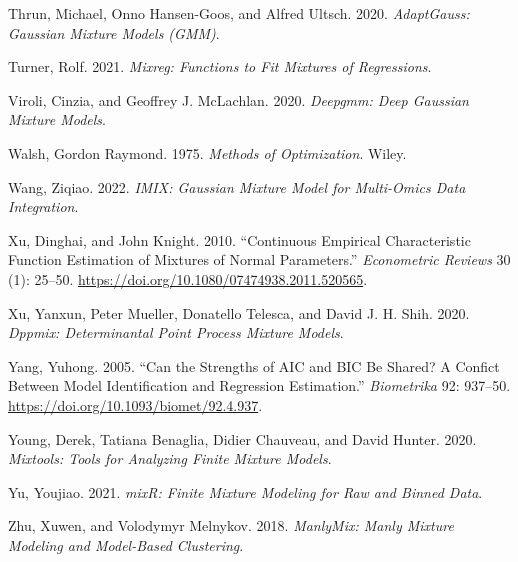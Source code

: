 \begin{CSLReferences}{1}{0}
\leavevmode{}%
Thrun, Michael, Onno Hansen-Goos, and Alfred Ultsch. 2020. \emph{AdaptGauss: Gaussian Mixture Models (GMM)}.

\leavevmode{}%
Turner, Rolf. 2021. \emph{Mixreg: Functions to Fit Mixtures of Regressions}.

\leavevmode{}%
Viroli, Cinzia, and Geoffrey J. McLachlan. 2020. \emph{Deepgmm: Deep Gaussian Mixture Models}.

\leavevmode{}%
Walsh, Gordon Raymond. 1975. \emph{Methods of {Optimization}}. {Wiley}.

\leavevmode{}%
Wang, Ziqiao. 2022. \emph{IMIX: Gaussian Mixture Model for Multi-Omics Data Integration}.

\leavevmode{}%
Xu, Dinghai, and John Knight. 2010. {``Continuous {Empirical Characteristic Function Estimation} of {Mixtures} of {Normal Parameters}.''} \emph{Econometric Reviews} 30 (1): 25--50. \url{https://doi.org/10.1080/07474938.2011.520565}.

\leavevmode{}%
Xu, Yanxun, Peter Mueller, Donatello Telesca, and David J. H. Shih. 2020. \emph{Dppmix: Determinantal Point Process Mixture Models}.

\leavevmode{}%
Yang, Yuhong. 2005. {``Can the Strengths of {AIC} and {BIC} Be Shared? {A} Confict Between Model Identification and Regression Estimation.''} \emph{Biometrika} 92: 937--50. \url{https://doi.org/10.1093/biomet/92.4.937}.

\leavevmode{}%
Young, Derek, Tatiana Benaglia, Didier Chauveau, and David Hunter. 2020. \emph{Mixtools: Tools for Analyzing Finite Mixture Models}.

\leavevmode{}%
Yu, Youjiao. 2021. \emph{mixR: Finite Mixture Modeling for Raw and Binned Data}.

\leavevmode{}%
Zhu, Xuwen, and Volodymyr Melnykov. 2018. \emph{ManlyMix: Manly Mixture Modeling and Model-Based Clustering}.

\end{CSLReferences}



\address{%
Bastien Chassagnol\\
Laboratoire de Probabilités, Statistiques et Modélisation (LPSM), UMR CNRS 8001\\%
4 Place Jussieu Sorbonne Université\\ 75005, Paris, France\\
%
%
\textit{ORCiD: \href{https://orcid.org/0000-0002-8955-2391}{0000-0002-8955-2391}}\\%
\href{mailto:bastien.chassagnol@upmc.fr}{\nolinkurl{bastien.chassagnol@upmc.fr}}%
}

